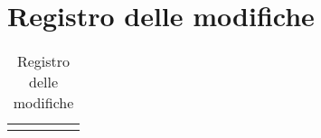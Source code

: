 \newpage

\section{Registro delle modifiche}

\begin{center}
\begin{longtable}{|c|c|c|c|c|}
\hline

\caption{Registro delle modifiche}
\end{longtable}
\end{center}
